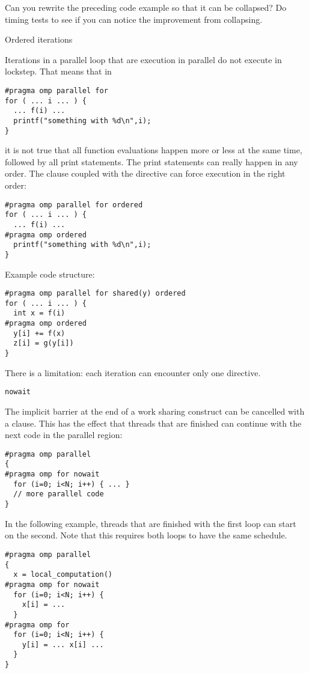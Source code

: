 \begin{exercise}
  Can you rewrite the preceding code example so that it can be
  collapsed?
  Do timing tests to see if you can notice the improvement from collapsing.
\end{exercise}

 {Ordered iterations}
\label{sec:omp-ordered}

Iterations in a parallel loop that are execution in parallel do not
execute in lockstep. That means that in
\begin{verbatim}
#pragma omp parallel for
for ( ... i ... ) {
  ... f(i) ...
  printf("something with %d\n",i);
}
\end{verbatim}
it is not true that all function evaluations happen more or less at
the same time, followed by all print statements. The print statements
can really happen in any order. The  clause
coupled with the  directive can
force execution in the right order:
\begin{verbatim}
#pragma omp parallel for ordered
for ( ... i ... ) {
  ... f(i) ...
#pragma omp ordered
  printf("something with %d\n",i);
}
\end{verbatim}
Example code structure:
\begin{verbatim}
#pragma omp parallel for shared(y) ordered
for ( ... i ... ) {
  int x = f(i)
#pragma omp ordered
  y[i] += f(x)
  z[i] = g(y[i])
}
\end{verbatim}
There is a limitation:
each iteration can encounter only one  directive.

 {\texttt{nowait}}
\label{sec:omp-nowait}

The implicit barrier at the end of a work sharing construct
can be cancelled with a  clause.
This has the effect that threads that are finished can continue
with the next code in the parallel region:
\begin{verbatim}
#pragma omp parallel
{
#pragma omp for nowait
  for (i=0; i<N; i++) { ... }
  // more parallel code
}
\end{verbatim}

In the following example, threads that are finished with the first loop
can start on the second. Note that this requires both loops to have
the same schedule.
\begin{verbatim}
#pragma omp parallel
{
  x = local_computation()
#pragma omp for nowait
  for (i=0; i<N; i++) { 
    x[i] = ... 
  }
#pragma omp for 
  for (i=0; i<N; i++) { 
    y[i] = ... x[i] ...
  }
}
\end{verbatim}

